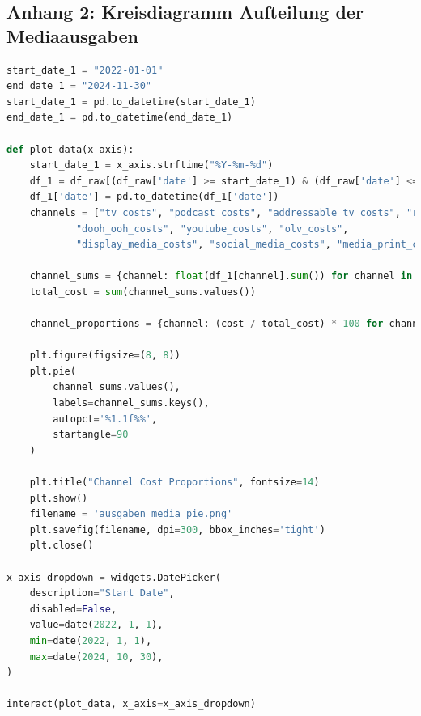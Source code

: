 \documentclass{common/nak}
\numberwithin{equation}{subsection}
\begin{document}
\subsection*{Anhang 2: Kreisdiagramm Aufteilung der Mediaausgaben}
\label{Anhang2KreisdiagrammAufteilungDerMediaausgaben}
\begin{lstlisting}[language=Python, linewidth=\textwidth]
start_date_1 = "2022-01-01"
end_date_1 = "2024-11-30"
start_date_1 = pd.to_datetime(start_date_1)
end_date_1 = pd.to_datetime(end_date_1)

def plot_data(x_axis):
    start_date_1 = x_axis.strftime("%Y-%m-%d")
    df_1 = df_raw[(df_raw['date'] >= start_date_1) & (df_raw['date'] <= end_date_1)].copy() 
    df_1['date'] = pd.to_datetime(df_1['date'])
    channels = ["tv_costs", "podcast_costs", "addressable_tv_costs", "radio_costs", 
            "dooh_ooh_costs", "youtube_costs", "olv_costs", 
            "display_media_costs", "social_media_costs", "media_print_costs"]

    channel_sums = {channel: float(df_1[channel].sum()) for channel in channels}
    total_cost = sum(channel_sums.values())

    channel_proportions = {channel: (cost / total_cost) * 100 for channel, cost in channel_sums.items()}

    plt.figure(figsize=(8, 8))
    plt.pie(
        channel_sums.values(),
        labels=channel_sums.keys(),
        autopct='%1.1f%%',
        startangle=90
    )

    plt.title("Channel Cost Proportions", fontsize=14)
    plt.show()
    filename = 'ausgaben_media_pie.png'
    plt.savefig(filename, dpi=300, bbox_inches='tight')
    plt.close() 

x_axis_dropdown = widgets.DatePicker(
    description="Start Date",
    disabled=False,
    value=date(2022, 1, 1),
    min=date(2022, 1, 1),  
    max=date(2024, 10, 30),
)

interact(plot_data, x_axis=x_axis_dropdown)
\end{lstlisting}

\newpage
\end{document}
